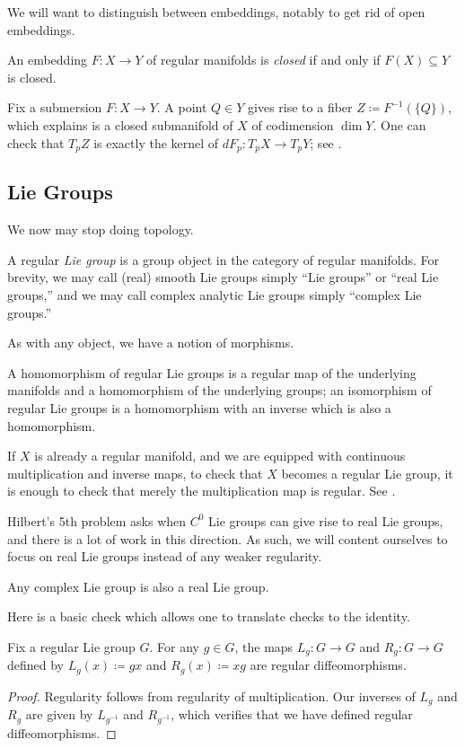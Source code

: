 \documentclass[../notes.tex]{subfiles}
\begin{document}
We will want to distinguish between embeddings, notably to get rid of open embeddings.
\begin{definition}[closed]
	An embedding $F\colon X\to Y$ of regular manifolds is \textit{closed} if and only if $F(X)\subseteq Y$ is closed.
\end{definition}
\begin{example}
	Fix a submersion $F\colon X\to Y$. A point $Q\in Y$ gives rise to a fiber $Z\coloneqq F^{-1}(\{Q\})$, which  explains is a closed submanifold of $X$ of codimension $\dim Y$. One can check that $T_pZ$ is exactly the kernel of $dF_p\colon T_pX\to T_pY$; see \cite[Proposition~5.37]{lee-manifolds}.
\end{example}

\subsection{Lie Groups}
We now may stop doing topology.
\begin{definition}
	A regular \textit{Lie group} is a group object in the category of regular manifolds. For brevity, we may call (real) smooth Lie groups simply ``Lie groups'' or ``real Lie groups,'' and we may call complex analytic Lie groups simply ``complex Lie groups.''
\end{definition}
As with any object, we have a notion of morphisms.
\begin{definition}[homomorphism]
	A homomorphism of regular Lie groups is a regular map of the underlying manifolds and a homomorphism of the underlying groups; an isomorphism of regular Lie groups is a homomorphism with an inverse which is also a homomorphism.
\end{definition}
\begin{remark}
	If $X$ is already a regular manifold, and we are equipped with continuous multiplication and inverse maps, to check that $X$ becomes a regular Lie group, it is enough to check that merely the multiplication map is regular. See \cite[Exercise~7-3]{lee-manifolds}.
\end{remark}
\begin{remark}
	Hilbert's 5th problem asks when $C^0$ Lie groups can give rise to real Lie groups, and there is a lot of work in this direction. As such, we will content ourselves to focus on real Lie groups instead of any weaker regularity.
\end{remark}
\begin{remark}
	Any complex Lie group is also a real Lie group.
\end{remark}
Here is a basic check which allows one to translate checks to the identity.
\begin{lemma} \label{lem:mult-diffeo}
	Fix a regular Lie group $G$. For any $g\in G$, the maps $L_g\colon G\to G$ and $R_g\colon G\to G$ defined by $L_g(x)\coloneqq gx$ and $R_g(x)\coloneqq xg$ are regular diffeomorphisms.
\end{lemma}
\begin{proof}
	Regularity follows from regularity of multiplication. Our inverses of $L_g$ and $R_g$ are given by $L_{g^{-1}}$ and $R_{g^{-1}}$, which verifies that we have defined regular diffeomorphisms.
\end{proof}
\end{document}
